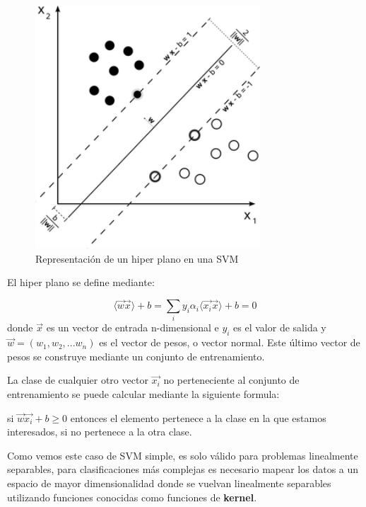 \begin{figure}[!ht]
	\centering
	\includegraphics[width=0.75\textwidth]{imaxes/svm.png}
	\caption{Representación de un hiper plano en una SVM}
	\label{svmfigure}
\end{figure}

El hiper plano se define mediante:

\begin{equation}
\langle\overrightarrow{w}\overrightarrow{x}\rangle + b = \sum_iy_i\alpha_i\langle\overrightarrow{x_i}\overrightarrow{x}\rangle + b = 0
\end{equation}
donde \(\overrightarrow{x}\) es un vector de entrada n-dimensional e \(y_i\) es el valor de salida y \(\overrightarrow{w} = (w_1,w_2,...w_n)\) es el vector de pesos, o vector normal. Este último vector de pesos se construye mediante un conjunto de entrenamiento.

La clase de cualquier otro vector \(\overrightarrow{x_i}\) no perteneciente al conjunto de entrenamiento se puede calcular mediante la siguiente formula:

si \(\overrightarrow{w}\overrightarrow{x_i}+b \ge 0\) entonces el elemento pertenece a la clase en la que estamos interesados, si no pertenece a la otra clase.

Como vemos este caso de SVM simple, es solo válido para problemas linealmente separables, para clasificaciones más complejas es necesario mapear los datos a un espacio de mayor dimensionalidad donde se vuelvan linealmente separables utilizando funciones conocidas como funciones de \textbf{kernel}.

